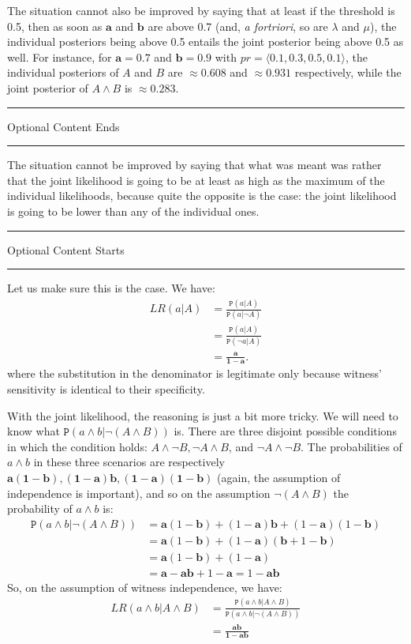 \documentclass{ifcolog}
\newcommand{\intermezzoa}{
	\begin{minipage}[c]{13cm}
	\begin{center}\rule{10cm}{0.4pt}



	\tiny{\sc Optional Content Starts}
	
	\vspace{-1mm}
	
	\rule{10cm}{0.4pt}\end{center}
	\end{minipage}\nopagebreak 
	}
\newcommand{\intermezzob}{\nopagebreak 
	\begin{minipage}[c]{13cm}
	\begin{center}\rule{10cm}{0.4pt}

	\tiny{\sc Optional Content Ends}
	
	\vspace{-1mm}
	
	\rule{10cm}{0.4pt}\end{center}
	\end{minipage}
	}
\newcommand{\pr}[1]{\mbox{$\mathtt{P}(#1)$}}
\newcommand{\n}{\neg}
\newcommand{\et}{\wedge}
\newcommand{\la}{\langle}
\newcommand{\ra}{\rangle}
\begin{document}
 The situation cannot also be improved by saying that at least if the threshold is 0.5, then as soon as $\mathbf{a}$ and $\mathbf{b}$  are above 0.7 (and, \emph{a fortriori}, so are $\lambda$ and $\mu$), the individual posteriors being above 0.5 entails the joint posterior being above 0.5 as well. For instance, for $\mathbf{a}=0.7$ and $\mathbf{b}=0.9$
 with $pr= \la 0.1, 0.3, 0.5, 0.1\ra$, the individual posteriors of $A$ and $B$ are $\approx 0.608$ and $\approx 0.931$ respectively, while the joint posterior of $A\et B$ is $\approx 0.283$.



\intermezzob

 The situation cannot be improved by saying that what was meant was rather that the joint likelihood is going to be at least as high as the maximum of the individual likelihoods, because quite the opposite is the case: the joint likelihood is going to be lower than any of the individual ones.

 \intermezzoa

Let us make sure this is the case.  We have: 
 \begin{align*}
 LR(a\vert A) & = \frac{\pr{a\vert A}}{\pr{a\vert \n A}}\\
 &= \frac{\pr{a\vert A}}{\pr{\n a\vert  A}} \\
& =  \frac{\mathbf{a}}{\mathbf{1-a}}.
\end{align*}
where the substitution in the denominator is legitimate only because witness' sensitivity is identical to their specificity. 

With the joint likelihood, the reasoning is just a bit more tricky. We will need to know what $\pr{a\et b \vert \n (A\et B)}$ is. There are three disjoint possible conditions in which the condition holds: $A\et \n B, \n A \et B$, and $\n A \et \n B$. The probabilities of $a\et b$ in these three scenarios are respectively $\mathbf{a(1-b),(1-a)b,(1-a)(1-b)}$ (again, the assumption of independence is important), and so on the assumption $\n(A\et B)$ the probability of $a\et b$ is:
\begin{align*}
\pr{a\et b \vert \n (A\et B)} & = 
\mathbf{a}(1-\mathbf{b})+(1-\mathbf{a})\mathbf{b}+(1-\mathbf{a})(1-\mathbf{b})\\ 
& = 
\mathbf{a}(1-\mathbf{b})+(1-\mathbf{a})(\mathbf{b} + 1-\mathbf{b})\\
& = \mathbf{a}(1-\mathbf{b})+(1-\mathbf{a})\\
& = \mathbf{a}-\mathbf{a}\mathbf{b}+1-\mathbf{a} = 1- \mathbf{a}\mathbf{b}
\end{align*}
So, on the assumption of witness independence, we have:
\begin{align*}
LR(a\et b \vert A \et B) & = \frac{\pr{a\et b \vert A \et B}}{\pr{a \et b\vert \n (A \et B)}} \\
& = \frac{\mathbf{ab}}{\mathbf{1-ab}}
\end{align*}
\end{document}

